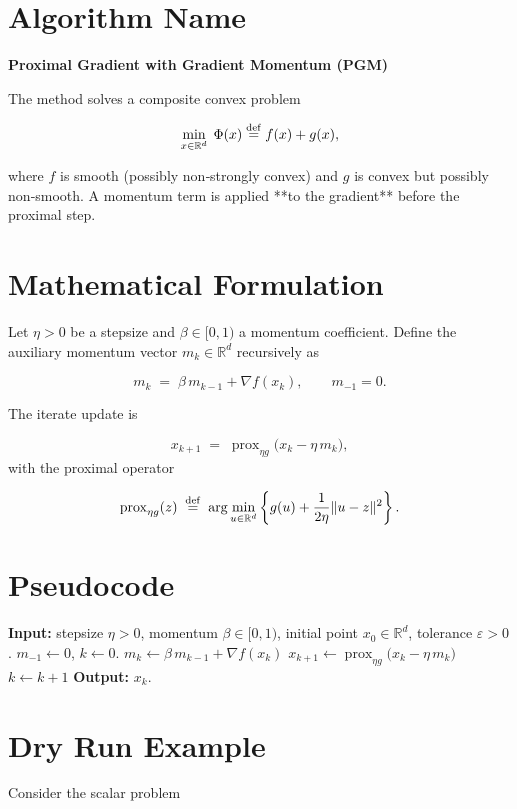\documentclass{article}
\begin{document}
\section*{Algorithm Name}
\textbf{Proximal Gradient with Gradient Momentum (PGM)}  

The method solves a composite convex problem  

\[
\min_{x\in\mathbb{R}^d}\; \Phi(x)\stackrel{\rm def}{=} f(x)+g(x),
\]

where $f$ is smooth (possibly non‑strongly convex) and $g$ is convex but possibly non‑smooth.  
A momentum term is applied **to the gradient** before the proximal step.

\section*{Mathematical Formulation}
Let $\eta>0$ be a stepsize and $\beta\in[0,1)$ a momentum coefficient.  
Define the auxiliary momentum vector $m_k\in\mathbb{R}^d$ recursively as  

\[
\boxed{m_k \;=\; \beta\,m_{k-1}+ \nabla f(x_k)},\qquad m_{-1}=0 .
\]

The iterate update is  

\[
\boxed{x_{k+1}\;=\;\operatorname{prox}_{\eta g}\!\bigl(x_k-\eta\, m_k\bigr)},
\]
with the proximal operator  

\[
\operatorname{prox}_{\eta g}(z)\;\stackrel{\rm def}{=}\;\arg\min_{u\in\mathbb{R}^d}
\left\{ g(u)+\frac{1}{2\eta}\|u-z\|^{2}\right\}.
\]

\section*{Pseudocode}
\begin{algorithm}[H]
\caption{Proximal Gradient with Gradient Momentum (PGM)}
\begin{algorithmic}[1]
\State \textbf{Input:} stepsize $\eta>0$, momentum $\beta\in[0,1)$,
           initial point $x_0\in\mathbb{R}^d$, tolerance $\varepsilon>0$.
\State $m_{-1}\gets 0$, $k\gets 0$.
    \State $m_k \gets \beta\,m_{k-1}+ \nabla f(x_k)$ 
    \State $x_{k+1}\gets \operatorname{prox}_{\eta g}\!\bigl(x_k-\eta\, m_k\bigr)$
    \State $k\gets k+1$
\EndWhile
\State \textbf{Output:} $x_k$.
\end{algorithmic}
\end{algorithm}

\section*{Dry Run Example}
Consider the scalar problem  
\end{document}
